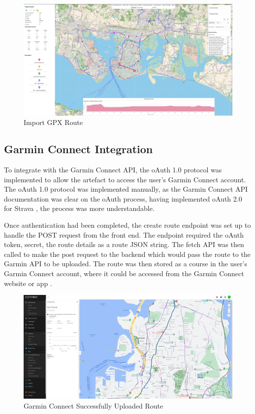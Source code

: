 \label{fig:route-import}
\begin{figure}[h!]
  \centering
  \includegraphics[width=425px]{figures/Progress Images/Iteration-3/SR48-49/SR48-Import GPX.png}
  \caption{Import GPX Route}
  \label{fig:gpx-import}
\end{figure}
\endgroup

\subsection{Garmin Connect Integration}
\label{iteration3:garmin-integration}

To integrate with the Garmin Connect API, the oAuth 1.0 protocol was implemented to allow the artefact to access the user's Garmin Connect account. The oAuth 1.0 protocol was implemented manually, as the Garmin Connect API documentation was clear on the oAuth process, having implemented oAuth 2.0 for Strava , the process was more understandable.

Once authentication had been completed, the create route endpoint was set up to handle the POST request from the front end. The endpoint required the oAuth token, secret, the route details as a route JSON string. The fetch API was then called to make the post request to the backend which would pass the route to the Garmin API to be uploaded. The route was then stored as a course in the user's Garmin Connect account, where it could be accessed from the Garmin Connect website or app . 

\label{fig:garmin-connect}
\begin{figure}[!ht]
  \centering
  \includegraphics[width=425px]{figures/Progress Images/Iteration-3/SR50/SR50 - Garmin Connect App Course Viewer.png}
  \caption{Garmin Connect Successfully Uploaded Route}
\end{figure}

